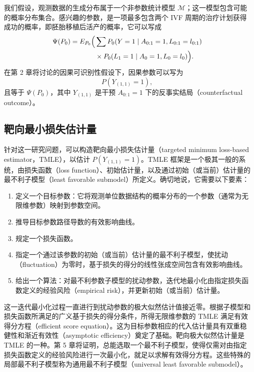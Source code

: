 我们假设，观测数据的生成分布属于一个非参数统计模型 $\mathcal M$；这一模型包含可能的概率分布集合。感兴趣的参数，是一项最多包含两个 IVF 周期的治疗计划获得成功的概率，即胚胎移植后活产的概率，它可以写成
\[
 \begin{aligned}
 \Psi(P_0)=E_{P_0}\Bigl(&\sum P_0(Y=1\mid A_{0:1}=1,L_{0:1}=l_{0:1})\\
 &{}\times P_0(L_1=1\mid A_0=1,L_0=l_0)\Bigr).
 \end{aligned}
\]
在第 2 章将讨论的因果可识别性假设下，因果参数可以写为
\[
 P(Y_{(1,1)}=1),
\]
且等于 $\Psi(P_0)$，其中 $Y_{(1,1)}$ 是干预 $A_{0:1}=1$ 下的反事实结局（counterfactual outcome）。

\subsection{靶向最小损失估计量}
\label{subsec:ch01-tmle}

针对这一研究问题，可以构造靶向最小损失估计量（targeted minimum loss-based estimator，TMLE），以估计 $P(Y_{(1,1)}=1)$。TMLE 框架是一个极其一般的系统，由损失函数（loss function）、初始估计量，以及通过初始（或当前）估计量的最不利子模型（least favorable submodel）所定义。确切地说，它需要以下要素：
\begin{enumerate}
 \item 定义一个目标参数：它将观测单位数据结构的概率分布的一个参数（通常为无限维参数）映射到参数空间。
 \item 推导目标参数路径导数的有效影响曲线。
 \item 规定一个损失函数。
 \item 指定一个通过该参数的初始（或当前）估计量的最不利子模型，使扰动（fluctuation）为零时，基于损失的得分的线性张成空间包含有效影响曲线。
 \item 给出一个算法：对最不利参数子模型的扰动参数，迭代地最小化由指定损失函数定义的经验风险（empirical risk），并更新初始（或当前）估计量。
\end{enumerate}

这一迭代最小化过程一直进行到扰动参数的极大似然估计值接近零。根据子模型和损失函数所满足的广义基于损失的得分条件，所得无限维参数的 TMLE 满足有效得分方程（efficient score equation）。这为目标参数相应的代入估计量具有双重稳健性和渐近有效性（asymptotic efficiency）奠定了基础。靶向极大似然估计量是 TMLE 的一种。第 5 章将证明，总能选取一个最不利子模型，使得仅需对由指定损失函数定义的经验风险进行一次最小化，就足以求解有效得分方程。这些特殊的局部最不利子模型称为通用最不利子模型（universal least favorable submodel）。

